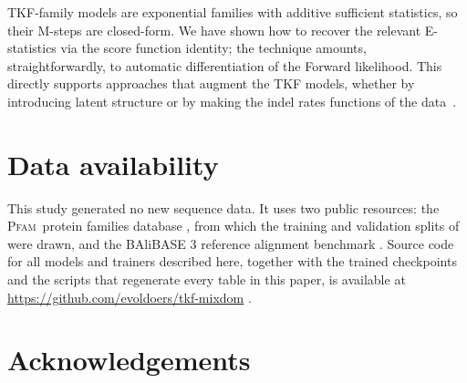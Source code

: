 \documentclass[11pt]{article}
\newcommand{\Pfam}{\textsc{Pfam}}
\begin{document}
TKF-family models are exponential families with additive sufficient
statistics, so their M-steps are closed-form.
We have shown how to recover the relevant E-statistics via the score function identity;
the technique amounts, straightforwardly, to automatic differentiation of the Forward likelihood.
This directly supports approaches that augment the TKF models, whether by introducing latent structure
or by making the indel rates functions of the data~\citep{LargeHolmes2026}.



\section*{Data availability}

This study generated no new sequence data. It uses two public resources: the
\Pfam\ protein families database \citep{Pfam2021}, from which the training and
validation splits of  were drawn, and the BAliBASE 3
reference alignment benchmark \citep{Thompson1999}. Source code for all models
and trainers described here, together with the trained checkpoints and the
scripts that regenerate every table in this paper, is available at
\url{https://github.com/evoldoers/tkf-mixdom} \citep{TKFMixDomCode}.

\section*{Acknowledgements}
\end{document}
